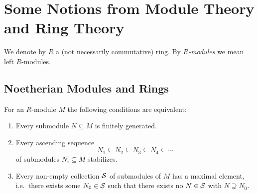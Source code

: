 \section{Some Notions from Module Theory and Ring Theory}

\begin{fluff}
  We denote by $R$ a (not necessarily commutative) ring.
  By \emph{$R$-modules} we mean left $R$-modules.
\end{fluff}










\subsection{Noetherian Modules and Rings}


\begin{lemma}
  For an $R$-module $M$ the following conditions are equivalent:
  \begin{enumerate}
    \item
      Every submodule $N \subseteq M$ is finitely generated.
    \item
      Every ascending sequence
      \[
                  N_1
        \subseteq N_2
        \subseteq N_3
        \subseteq N_4
        \subseteq \dotsb
      \]
      of submodules $N_i \subseteq M$ stabilizes.
    \item
      Every non-empty collection $\mathcal{S}$ of submodules of $M$ has a maximal element, i.e.\ there exists some $N_0 \in \mathcal{S}$ such that there exists no $N \in \mathcal{S}$ with $N \supsetneq N_0$.
  \end{enumerate}
\end{lemma}


